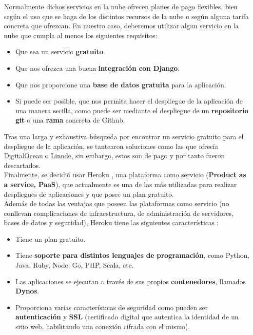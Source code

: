 Normalmente dichos servicios en la nube ofrecen planes de pago flexibles, bien según
el uso que se haga de los distintos recursos de la nube o según alguna tarifa concreta
que ofrezcan. En nuestro caso, deberemos utilizar algun servicio en la nube que cumpla
al menos los siguientes requisitos:

    \begin{itemize}
        \item Que sea un servicio \textbf{gratuito}.
        \item Que nos ofrezca una buena \textbf{integración con Django}.
        \item Que nos proporcione una \textbf{base de datos gratuita} para la aplicación.
        \item Si puede ser posible, que nos permita hacer el despliegue de la
        aplicación de una manera secilla, como puede ser mediante el despliegue de un
        \textbf{repositorio git} o una \textbf{rama} concreta de Github. 
    \end{itemize}

Tras una larga y exhaustiva búsqueda por encontrar un servicio gratuito para el
despliegue de la aplicación, se tantearon soluciones como las que ofrecía
\href{https://docs.digitalocean.com/tutorials/app-deploy-django-app/}{DigitalOcean}
o \href{https://www.linode.com/docs/products/tools/marketplace/guides/django/}{Linode},
sin embargo, estos son de pago y por tanto fueron descartados.\\

Finalmente, se decidió usar Heroku \cite{heroku}, una plataforma como servicio
(\textbf{Product as a service, PaaS}), que actualmente es una de las más utilizadas
para realizar despliegues de aplicaciones y que posee un plan gratuito.\\

Además de todas las ventajas que poseen las plataformas como servicio (no conllevan
complicaciones de infraestructura, de administración de servidores, bases de datos y
seguridad), Heroku tiene las siguientes características \cite{heroku-features}:

    \begin{itemize}
        \item Tiene un plan gratuito.
        \item Tiene \textbf{soporte para distintos lenguajes de programación}, como Python,
        Java, Ruby, Node, Go, PHP, Scala, etc.
        \item Las aplicaciones se ejecutan a través de sus propios \textbf{contenedores},
        llamados \textbf{Dynos}.
        \item Proporciona varias características de seguridad como pueden ser
        \textbf{autenticación} y \textbf{SSL} (certificado digital que autentica la
        identidad de un sitio web, habilitando una conexión cifrada con el mismo).
    \end{itemize}

